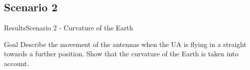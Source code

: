 \subsection{Scenario 2}

\begin{frame}{Results}{Scenario 2 - Curvature of the Earth}

  \begin{block}{Goal}
	Describe the movement of the antennas when the UA is flying in a straight towards a further position.
	Show that the curvature of the Earth is taken into account.
  \end{block}

  \begin{figure}[H]
    \centerline{
    \hfill
    }
  \end{figure}

\end{frame}



